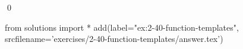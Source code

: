 
\begin{ex}
  \label{ex:2-40-function-templates}
  
  \qed
\end{ex}
\begin{python0}
from solutions import *
add(label="ex:2-40-function-templates",
    srcfilename='exercises/2-40-function-templates/answer.tex')
\end{python0}
